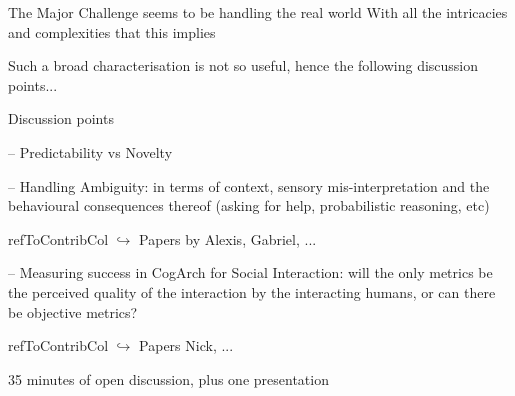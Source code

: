 \documentclass[compress]{beamer}
\newcommand{\refToContrib}[1]{%
    \begin{beamercolorbox}[wd=\linewidth,ht=2ex,dp=0.7ex]{refToContribCol}%
    \hspace{0.5em}$\hookrightarrow$ #1%
    \end{beamercolorbox}%
}%
\begin{document}
\begin{frame}{}

    \centering

    \begin{exampleblock}{The Major Challenge seems to be handling the real world}
        With all the intricacies and complexities that this implies
    \end{exampleblock}
    \vspace{2em}
    Such a broad characterisation is not so useful, hence the following discussion points...


\end{frame}



\begin{frame}{Discussion points}
    
    -- Predictability vs Novelty
	    
    -- Handling Ambiguity: in terms of context, sensory mis-interpretation and the behavioural consequences thereof (asking for help, probabilistic reasoning, etc)
    \refToContrib{Papers by Alexis, Gabriel, ...}
    
	-- Measuring success in CogArch for Social Interaction: will the only metrics be the perceived quality of the interaction by the interacting humans, or can there be objective metrics?
	\refToContrib{Papers Nick, ...} 
    
    \vspace{0.5cm}

    35 minutes of open discussion, plus one presentation

\end{frame}


%
%
%
%
%
%
%  
\end{document}
